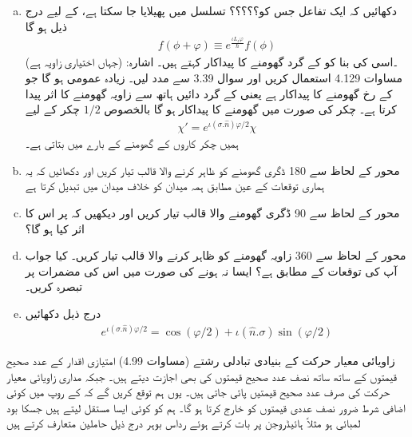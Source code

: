 \begin{enumerate}[a.]
\item  دکھائیں کہ ایک تفاعل  جس کو؟؟؟؟؟ تسلسل میں پھیلایا جا سکتا ہے، کے لیے درج ذیل ہو گا 
\begin{align*}
    f(\phi+\varphi)\equiv e^{\frac{\iota L_z\varphi}{\hslash}}f(\phi)
\end{align*} 
(جہاں  اختیاری زاویہ ہے) ۔اسی کی بنا  کو  کے گرد گھومنے کا پیداکار کہتے ہیں۔ اشارہ: مساوات 4.129 استعمال کریں اور سوال 3.39 سے مدد لیں۔ زیادہ عمومی  ہو گا جو  کے رخ گھومنے کا پیداکار ہے یعنی    کے گرد دائیں ہاتھ سے     زاویہ   گھومنے کا اثر پیدا کرتا ہے۔ چکر کی صورت میں گھومنے کا پیداکار   ہو گا بالخصوص  \(1/2\)  چکر کے لیے
\begin{align}
    \chi'=e^{\iota(\sigma.\hat{n})\varphi/2}\chi
\end{align} ہمیں چکر کاروں کے گھومنے کے بارے میں بتاتی ہے۔
\item محور  کے لحاظ سے 180 ڈگری گھومنے کو ظاہر کرنے والا  قالب تیار کریں اور دکھائیں کہ یہ ہماری توقعات کے عین مطابق ہمہ میدان  کو خلاف میدان  میں تبدیل کرتا ہے 
\item محور  کے لحاظ سے 90 ڈگری گھومنے والا قالب تیار کریں اور دیکھیں کہ  پر اس کا اثر کیا ہو گا؟ 
\item محور  کے لحاظ سے 360 زاویہ گھومنے کو ظاہر کرنے والا قالب تیار کریں۔ کیا جواب آپ کی توقعات کے مطابق ہے؟ ایسا نہ ہونے کی صورت میں اس کی مضمرات پر تبصرہ کریں۔
\item درج ذیل دکھائیں 
\begin{align} e^{\iota(\sigma.\hat{n})\varphi/2}=\cos{(\varphi/2)}+\iota(\hat{n}.\sigma)\sin{(\varphi/2)}
\end{align}
\end{enumerate}
زاویائی معیار حرکت کے بنیادی تبادلی رشتے (مساوات 4.99) امتیازی اقدار کے عدد صحیح قیمتوں کے ساتھ ساتھ نصف عدد صحیح قیمتوں کی بھی اجازت دیتے ہیں۔ جبکہ مداری زاویائی معیار حرکت کی صرف عدد صحیح قیمتیں پائی جاتی ہیں۔ یوں ہم توقع کریں گے کہ  کے روپ میں کوئی اضافی شرط ضرور نصف عددی قیمتوں کو خارج کرتا ہو گا۔ ہم  کو کوئی ایسا مستقل لیتے ہیں جسکا بود لمبائی ہو مثلاً ہائیڈروجن پر بات کرتے ہوئے رداس بوہر درج ذیل حاملین متعارف کرتے ہیں 
